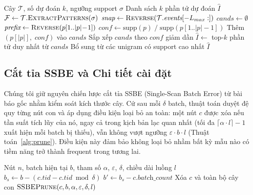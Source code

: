 \documentclass{article}
\begin{document}
\begin{algorithm}[!ht]
\caption{Dự đoán phần tử tiếp theo (Next-Item Prediction)}
\label{alg:predict}
\small
\begin{algorithmic}[1]
\REQUIRE Cây $\mathcal{T}$, số dự đoán $k$, ngưỡng support $\sigma$
\ENSURE Danh sách $k$ phần tử dự đoán $\hat{I}$
\STATE $\mathcal{F} \leftarrow \mathcal{T}.\textsc{ExtractPatterns}(\sigma)$
\STATE $\textit{snap} \leftarrow \textsc{Reverse}(\mathcal{T}.\textit{events}[-L_{max}:])$ 
\STATE $\textit{cands} \leftarrow \emptyset$
    \STATE $\textit{prefix} \leftarrow \textsc{Reverse}(p[1..|p|\!-\!1])$
        \STATE $\textit{conf} \leftarrow \text{supp}(p) \;/\; \text{supp}(p[1..|p|\!-\!1])$
        \STATE Thêm $(p[|p|],\; \textit{conf})$ vào $\textit{cands}$
    \ENDIF
\ENDFOR
\STATE Sắp xếp $\textit{cands}$ theo $\textit{conf}$ giảm dần
\STATE $\hat{I} \leftarrow$ top-$k$ phần tử duy nhất từ $\textit{cands}$
    \STATE Bổ sung từ các unigram có support cao nhất 
\ENDIF
\RETURN $\hat{I}$
\end{algorithmic}
\end{algorithm}

\vspace{-0.5em}
\subsection{Cắt tỉa SSBE và Chi tiết cài đặt}
Chúng tôi giữ nguyên chiến lược cắt tỉa SSBE (Single-Scan Batch Error) từ bài báo gốc \cite{hassani2019} nhằm kiểm soát kích thước cây. Cứ sau mỗi $\delta$ batch, thuật toán duyệt đệ quy từng nút con và áp dụng điều kiện loại bỏ an toàn: một nút $c$ được xóa nếu tần suất tích lũy của nó, ngay cả trong kịch bản lạc quan nhất (tối đa $\lceil \alpha \cdot l \rceil - 1$ xuất hiện mỗi batch bị thiếu), vẫn không vượt ngưỡng $\varepsilon \cdot b \cdot l$ (Thuật toán~\ref{alg:prune}). Điều kiện này đảm bảo không loại bỏ nhầm bất kỳ mẫu nào có tiềm năng trở thành frequent trong tương lai.

\begin{algorithm}[!ht]
\caption{Cắt tỉa SSBE (SSBEPrune)}
\label{alg:prune}
\small
\begin{algorithmic}[1]
\REQUIRE Nút $n$, batch hiện tại $b$, tham số $\alpha$, $\varepsilon$, $\delta$, chiều dài luồng $l$
    \STATE $b_s \leftarrow b - (c.\textit{tid} - c.\textit{tid} \bmod \delta)$ 
    \STATE $b' \leftarrow b_s - c.\textit{batch\_count}$ 
        \STATE Xóa $c$ và toàn bộ cây con 
    \ELSE
        \STATE $\textsc{SSBEPrune}(c, b, \alpha, \varepsilon, \delta, l)$ 
    \ENDIF
\ENDFOR
\end{algorithmic}
\end{algorithm}
\end{document}
